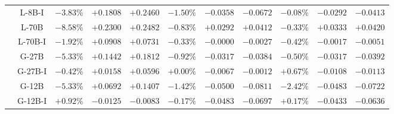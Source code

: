 {\begin{longtable}{|c|c|ccc|ccc|ccc|}
\cline{2-11}
 & L-8B-I & $-3.83\%$ & $+0.1808$ & $+0.2460$ & $-1.50\%$ & $-0.0358$ & $-0.0672$ & $-0.08\%$ & $-0.0292$ & $-0.0413$ \\
\cline{2-11}
 & L-70B & $-8.58\%$ & $+0.2300$ & $+0.2482$ & $-0.83\%$ & $+0.0292$ & $+0.0412$ & $-0.33\%$ & $+0.0333$ & $+0.0420$ \\
\cline{2-11}
 & L-70B-I & $-1.92\%$ & $+0.0908$ & $+0.0731$ & $-0.33\%$ & $-0.0000$ & $-0.0027$ & $-0.42\%$ & $-0.0017$ & $-0.0051$ \\
\cline{2-11}
 & G-27B & $-5.33\%$ & $+0.1442$ & $+0.1812$ & $-0.92\%$ & $-0.0317$ & $-0.0384$ & $-0.50\%$ & $-0.0317$ & $-0.0392$ \\
\cline{2-11}
 & G-27B-I & $-0.42\%$ & $+0.0158$ & $+0.0596$ & $+0.00\%$ & $-0.0067$ & $-0.0012$ & $+0.67\%$ & $-0.0108$ & $-0.0113$ \\
\cline{2-11}
 & G-12B & $-5.33\%$ & $+0.0692$ & $+0.1407$ & $-1.42\%$ & $-0.0500$ & $-0.0811$ & $-2.42\%$ & $-0.0483$ & $-0.0722$ \\
\cline{2-11}
 & G-12B-I & $+0.92\%$ & $-0.0125$ & $-0.0083$ & $-0.17\%$ & $-0.0483$ & $-0.0697$ & $+0.17\%$ & $-0.0433$ & $-0.0636$ \\
\hline
\end{longtable}
}
